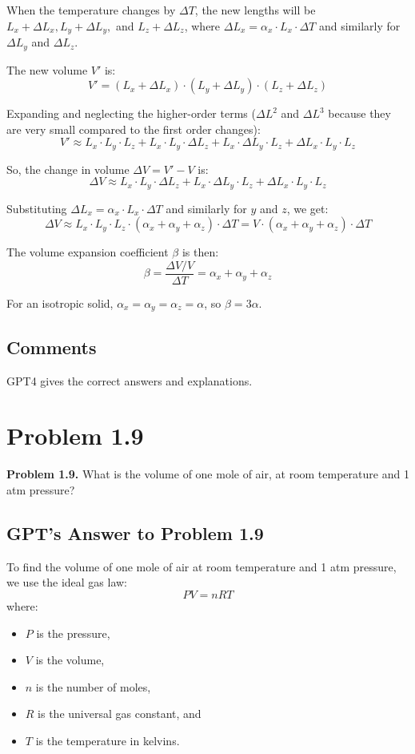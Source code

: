 \documentclass[12pt]{article}
\begin{document}
When the temperature changes by $\Delta T$, the new lengths will be $L_x + \Delta L_x, L_y + \Delta L_y,$ and $L_z + \Delta L_z$, where $\Delta L_x = \alpha_x \cdot L_x \cdot \Delta T$ and similarly for $\Delta L_y$ and $\Delta L_z$.

The new volume $V'$ is:
\[
V' = (L_x + \Delta L_x) \cdot (L_y + \Delta L_y) \cdot (L_z + \Delta L_z)
\]

Expanding and neglecting the higher-order terms ($\Delta L^2$ and $\Delta L^3$ because they are very small compared to the first order changes):
\[
V' \approx L_x \cdot L_y \cdot L_z + L_x \cdot L_y \cdot \Delta L_z + L_x \cdot \Delta L_y \cdot L_z + \Delta L_x \cdot L_y \cdot L_z
\]

So, the change in volume $\Delta V = V' - V$ is:
\[
\Delta V \approx L_x \cdot L_y \cdot \Delta L_z + L_x \cdot \Delta L_y \cdot L_z + \Delta L_x \cdot L_y \cdot L_z
\]

Substituting $\Delta L_x = \alpha_x \cdot L_x \cdot \Delta T$ and similarly for $y$ and $z$, we get:
\[
\Delta V \approx L_x \cdot L_y \cdot L_z \cdot (\alpha_x + \alpha_y + \alpha_z) \cdot \Delta T = V \cdot (\alpha_x + \alpha_y + \alpha_z) \cdot \Delta T
\]

The volume expansion coefficient $\beta$ is then:
\[
\beta = \frac{\Delta V / V}{\Delta T} = \alpha_x + \alpha_y + \alpha_z
\]

For an isotropic solid, $\alpha_x = \alpha_y = \alpha_z = \alpha$, so $\beta = 3\alpha$.

\subsection*{Comments}

GPT4 gives the correct answers and explanations.

\section*{Problem 1.9}

\textbf{Problem 1.9.} What is the volume of one mole of air, at room temperature and 1 atm pressure?

\subsection*{GPT's Answer to Problem 1.9}

To find the volume of one mole of air at room temperature and 1 atm pressure, we use the ideal gas law:
\[
PV = nRT
\]
where:
\begin{itemize}
  \item \(P\) is the pressure,
  \item \(V\) is the volume,
  \item \(n\) is the number of moles,
  \item \(R\) is the universal gas constant, and
  \item \(T\) is the temperature in kelvins.
\end{itemize}
\end{document}
